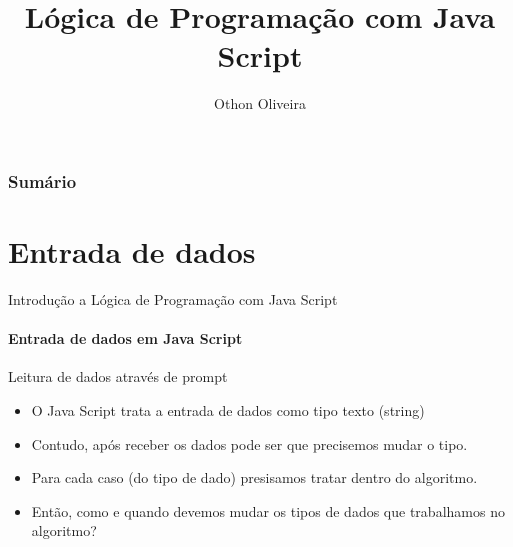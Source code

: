\documentclass[13pt, xcolor={dvipsnames,svgnames}, portuguese]{beamer}
\author{Othon Oliveira}
\title{Lógica de Programação com Java Script}
\institute{SENAC - PROA}
\date{}
\begin{document}
\begin{frame}
\titlepage
\end{frame}

\newcommand{\capa}{
    \begin{tikzpicture}[remember picture,overlay]
        \node at (current page.south west)
            {\begin{tikzpicture}[remember picture, overlay]
                \fill[shading=radial,top color=orange,bottom color=orange,middle color=yellow] (0,0) rectangle (\paperwidth,\paperheight);
            \end{tikzpicture}
          };
    \end{tikzpicture}
}

\begin{frame}\frametitle{Sumário}
\tableofcontents
\end{frame}


\section{Entrada de dados}
\begin{frame}{Introdução a Lógica de Programação com Java Script}
\framesubtitle{ Entrada de dados em Java Script}
	\begin{block}{Leitura de dados através de prompt}
		\begin{itemize}
		  \item[a.] O Java Script trata a entrada de dados como tipo texto (string)
		  \pause
		  \item[b.] Contudo, após receber os dados pode ser que precisemos mudar o tipo.
		   \pause		  
		  \item[c.] Para cada caso (do tipo de dado) presisamos tratar dentro do algoritmo. 
		  \pause
		  \item[d.] Então, como e quando devemos mudar os tipos de dados que trabalhamos no algoritmo?
		\end{itemize}
	\end{block} 
\end{frame}


\end{document}
